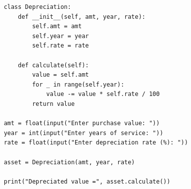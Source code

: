 \begin{verbatim}
    class Depreciation:
        def __init__(self, amt, year, rate):
            self.amt = amt
            self.year = year
            self.rate = rate
    
        def calculate(self):
            value = self.amt
            for _ in range(self.year):
                value -= value * self.rate / 100
            return value
    
    amt = float(input("Enter purchase value: "))
    year = int(input("Enter years of service: "))
    rate = float(input("Enter depreciation rate (%): "))
    
    asset = Depreciation(amt, year, rate)
    
    print("Depreciated value =", asset.calculate())
\end{verbatim}